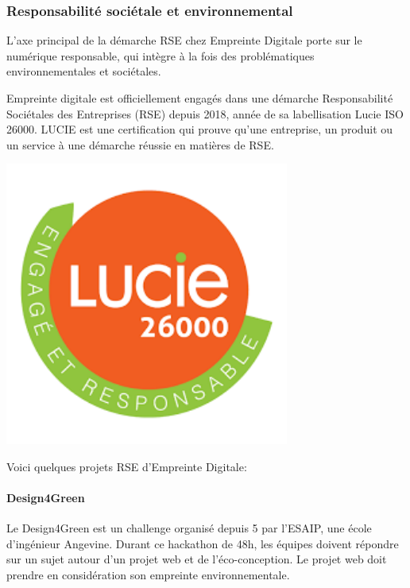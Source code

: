 \documentclass[12pt]{article}
\begin{document}
\subsubsection{Responsabilité sociétale et environnemental}
L'axe principal de la démarche \gls{RSE} chez Empreinte Digitale porte sur le numérique responsable, qui intègre à la fois des problématiques environnementales et sociétales.

\noindent%
\begin{minipage}{.7\textwidth}%
Empreinte digitale est officiellement engagés dans une démarche Responsabilité Sociétales des Entreprises (\gls{RSE}) depuis 2018, année de sa labellisation Lucie ISO 26000. 
LUCIE est une certification qui prouve qu'une entreprise, un produit ou un service à une démarche réussie en matières de \gls{RSE}. \cite{Lucie}

\end{minipage}%
\hfill
\begin{minipage}{.3\textwidth}%
\begin{center}
\includegraphics[width=0.7\textwidth]{src/logo_lucie.png}
\end{center}
\end{minipage}%

Voici quelques projets \gls{RSE} d'Empreinte Digitale:
\paragraph{Design4Green}
Le Design4Green est un challenge organisé depuis 5 par l'ESAIP, une école d'ingénieur Angevine.
Durant ce hackathon de 48h, les équipes doivent répondre sur un sujet autour d'un projet web et de l'éco-conception.
Le projet web doit prendre en considération son empreinte environnementale.
\end{document}
